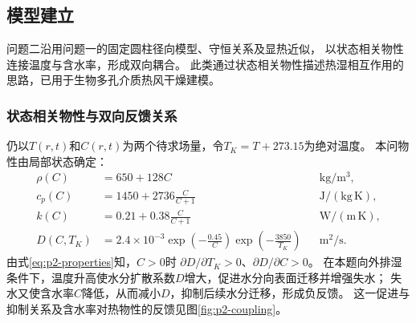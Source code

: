 \subsection{模型建立}
\label{sec:p2-model}

问题二沿用问题一的固定圆柱径向模型、守恒关系及显热近似，
以状态相关物性连接温度与含水率，形成双向耦合。
此类通过状态相关物性描述热湿相互作用的思路，已用于生物多孔介质热风干燥建模\cite{porous-drying}。

\subsubsection{状态相关物性与双向反馈关系}

仍以$T(r,t)$和$C(r,t)$为两个待求场量，令$T_K=T+273.15$为绝对温度。
本问物性由局部状态确定：
\begin{equation}
\begin{aligned}
  \rho(C)&=650+128C
    &&\mathrm{kg/m^3},\\
  c_p(C)&=1450+2736\frac{C}{C+1}
    &&\mathrm{J/(kg\,K)},\\
  k(C)&=0.21+0.38\frac{C}{C+1}
    &&\mathrm{W/(m\,K)},\\
  D(C,T_K)&=2.4\times10^{-3}
    \exp\!\left(-\frac{0.45}{C}\right)
    \exp\!\left(-\frac{3850}{T_K}\right)
    &&\mathrm{m^2/s}.
\end{aligned}
\label{eq:p2-properties}
\end{equation}
由式\eqref{eq:p2-properties}知，$C>0$时
$\partial D/\partial T_K>0$、$\partial D/\partial C>0$。
在本题向外排湿条件下，温度升高使水分扩散系数$D$增大，促进水分向表面迁移并增强失水；
失水又使含水率$C$降低，从而减小$D$，抑制后续水分迁移，形成负反馈。
这一促进与抑制关系及含水率对热物性的反馈见图\ref{fig:p2-coupling}。

